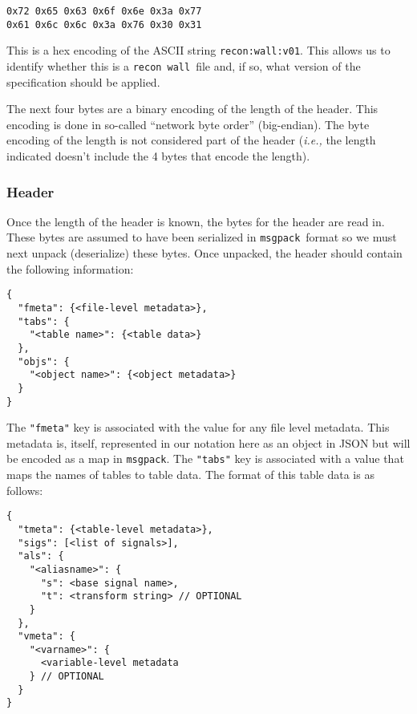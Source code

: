 \documentclass[11pt,a4paper,twocolumn]{article}
\newcommand{\recon}{\texttt{recon}}
\newcommand{\wall}{\texttt{wall}}
\newcommand{\msgpack}{\texttt{msgpack}}
\newcommand{\code}[1]{\texttt{#1}} %
\begin{document}
\begin{verbatim}
0x72 0x65 0x63 0x6f 0x6e 0x3a 0x77
0x61 0x6c 0x6c 0x3a 0x76 0x30 0x31
\end{verbatim}

This is a hex encoding of the ASCII string \code{recon:wall:v01}.
This allows us to identify whether this is a \recon\ \wall\ file and, if
so, what version of the specification should be applied.

The next four bytes are a binary encoding of the length of the header.
This encoding is done in so-called ``network byte order''
(big-endian).  The byte encoding of the length is not considered part
of the header (\textit{i.e.,} the length indicated doesn't include the
4 bytes that encode the length).

\subsubsection{Header}

Once the length of the header is known, the bytes for the header are
read in.  These bytes are assumed to have been serialized in
\msgpack\ format so we must next unpack (deserialize) these bytes.
Once unpacked, the header should contain the following information:

\begin{verbatim}
{
  "fmeta": {<file-level metadata>},
  "tabs": {
    "<table name>": {<table data>}
  },
  "objs": {
    "<object name>": {<object metadata>}
  }
}
\end{verbatim}

The \code{"fmeta"} key is associated with the value for any file level
metadata.  This metadata is, itself, represented in our notation here
as an object in JSON but will be encoded as a map in \msgpack.  The
\code{"tabs"} key is associated with a value that maps the names of
tables to table data.  The format of this table data is as follows:

\begin{verbatim}
{
  "tmeta": {<table-level metadata>},
  "sigs": [<list of signals>],
  "als": {
    "<aliasname>": {
      "s": <base signal name>,
      "t": <transform string> // OPTIONAL
    }
  },
  "vmeta": {
    "<varname>": {
      <variable-level metadata
    } // OPTIONAL
  }
}
\end{verbatim}
\end{document}
